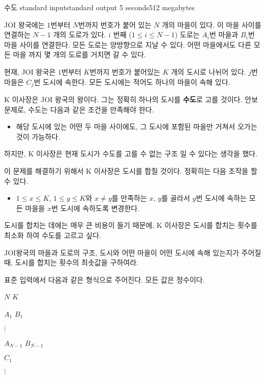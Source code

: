\begin{problem}{수도}
	{standard input}{standard output}
	{5 seconds}{512 megabytes}{}
	
	JOI 왕국에는 $1$번부터 $N$번까지 번호가 붙어 있는 $N$ 개의 마을이 있다. 이 마을 사이를 연결하는 $N-1$ 개의 도로가 있다. $i$ 번째 ($1 \le i \le N-1$) 도로는 $A_i$번 마을과 $B_i$번 마을 사이를 연결한다. 모든 도로는 양방향으로 지날 수 있다. 어떤 마을에서도 다른 모든 마을 까지 몇 개의 도로를 거치면 갈 수 있다.
	
	현재, JOI 왕국은 $1$번부터 $K$번까지 번호가 붙어있는 $K$ 개의 도시로 나뉘어 있다. $j$번 마을은 $C_j$번 도시에 속한다. 모든 도시에는 적어도 하나의 마을이 속해 있다.
	
	K 이사장은 JOI 왕국의 왕이다. 그는 정확히 하나의 도시를 \textbf{수도}로 고를 것이다. 안보 문제로, 수도는 다음과 같은 조건을 만족해야 한다.
	
	\begin{itemize}
		\item[] 해당 도시에 있는 어떤 두 마을 사이에도, 그 도시에 포함된 마을만 거쳐서 오가는 것이 가능하다.
	\end{itemize}

	하지만, K 이사장은 현재 도시가 수도를 고를 수 없는 구조 일 수 있다는 생각을 했다.
	
	이 문제를 해결하기 위해서 K 이사장은 도시를 합칠 것이다. 정확히는 다음 조작을 할 수 있다.
	
	\begin{itemize}
		\item[] $1 \le x \le K$, $1 \le y \le K$와 $x \ne y$를 만족하는 $x$, $y$를 골라서 $y$번 도시에 속하는 모든 마을을 $x$번 도시에 속하도록 변경한다.
	\end{itemize}

	도시를 합치는 데에는 매우 큰 비용이 들기 때문에, K 이사장은 도시를 합치는 횟수를 최소화 하여 수도를 고르고 싶다.
	
	JOI왕국의 마을과 도로의 구조, 도시와 어떤 마을이 어떤 도시에 속해 있는지가 주어질 때, 도시를 합치는 횟수의 최솟값을 구하여라.
	
	\InputFile
	
	표준 입력에서 다음과 같은 형식으로 주어진다. 모든 값은 정수이다.

	$N$ $K$
	
	$A_1$ $B_1$
	
	$\vdots$
	
	$A_{N-1}$ $B_{N-1}$
	
	$C_1$
	
	$\vdots$
	

\end{problem}
